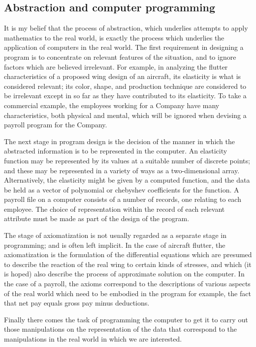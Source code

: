 \subsection{Abstraction and computer programming}

It is my belief that the process of abstraction, which underlies attempts to apply mathematics to the real world, is exactly the process which underlies the application of computers in the real world. The first requirement in designing a program is to concentrate on relevant features of the situation, and to ignore factors which are believed irrelevant. For example, in analyzing the flutter characteristics of a proposed wing design of an aircraft, its elasticity is what is considered relevant; its color, shape, and production technique are considered to be irrelevant except in so far as they have contributed to its elasticity. To take a commercial example, the employees working for a Company have many characteristics, both physical and mental, which will be ignored when devising a payroll program for the Company.

The next stage in program design is the decision of the manner in which the abstracted information is to be represented in the computer. An elasticity function may be represented by its values at a suitable number of discrete points; and these may be represented in a variety of ways as a two-dimensional array. Alternatively, the elasticity might be given by a computed function, and the data be held as a vector of polynomial or chebyshev coefficients for the function. A payroll file on a computer consists of a number of records, one relating to each employee. The choice of representation within the record of each relevant attribute must be made as part of the design of the program.

The stage of axiomatization is not usually regarded as a separate stage in programming; and is often left implicit. In the case of aircraft flutter, the axiomatization is the formulation of the differential equations which are presumed to describe the reaction of the real wing to certain kinds of stresses, and which (it is hoped) also describe the process of approximate solution on the computer. In the case of a payroll, the axioms correspond to the descriptions of various aspects of the real world which need to be embodied in the program \textemdash{} for example, the fact that net pay equals gross pay minus deductions.

Finally there comes the task of programming the computer to get it to carry out those manipulations on the representation of the data that correspond to the manipulations in the real world in which we are interested. 

